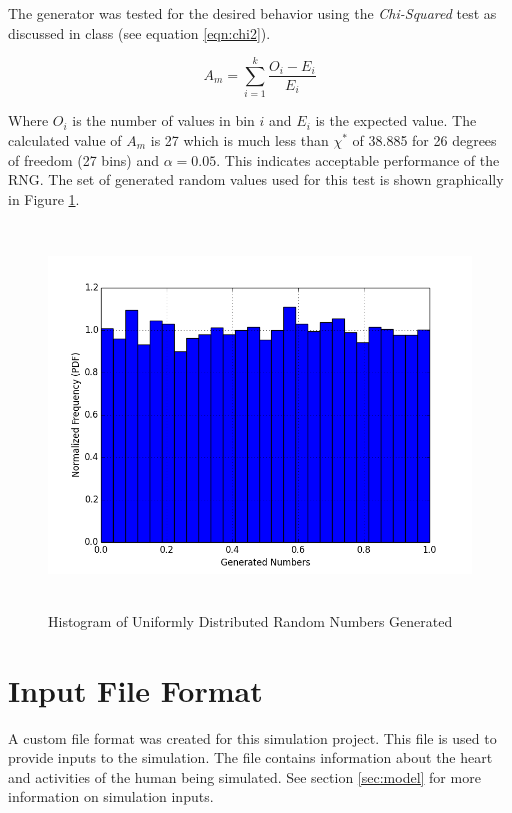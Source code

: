 \documentclass[paper=a4, fontsize=11pt]{scrartcl}
\numberwithin{equation}{section}		%
\numberwithin{figure}{section}			%
\numberwithin{table}{section}		    %
\begin{document}
\begin{appendices}
\newpage
The generator was tested for the desired behavior using the \emph{Chi-Squared} test 
\cite{Navidi2008Stats} as discussed in class (see equation \ref{eqn:chi2}). 

\begin{equation} \label{eqn:chi2}
A_m = \sum_{i=1}^{k} \frac{O_i - E_i}{E_i}
\end{equation} 

\noindent
Where $O_i$ is the number of values in bin $i$ and $E_i$ is the expected value.
The calculated value of $A_m$ is 27 which is much less than $\chi^*$ of 38.885 for 26 degrees of 
freedom (27 bins) and $\alpha = 0.05$. This indicates acceptable performance of the RNG. The set of 
generated random values used for this test is shown graphically in Figure \ref{fig:A:URNG}.\\

\begin{figure}[H]
	\begin{center} 
		\includegraphics[height=4in,width=5.5in]{uniform_rng} 
		\caption{Histogram of Uniformly Distributed Random Numbers Generated\label{fig:A:URNG}}
	\end{center} 
\end{figure}

\newpage
\section{Input File Format}\label{sec:A:map}
A custom file format was created for this simulation project. This file is used to provide inputs to
the simulation. The file contains information about the heart and activities of the human being 
simulated. See section \ref{sec:model} for more information on simulation inputs.


\end{appendices}
\end{document}
